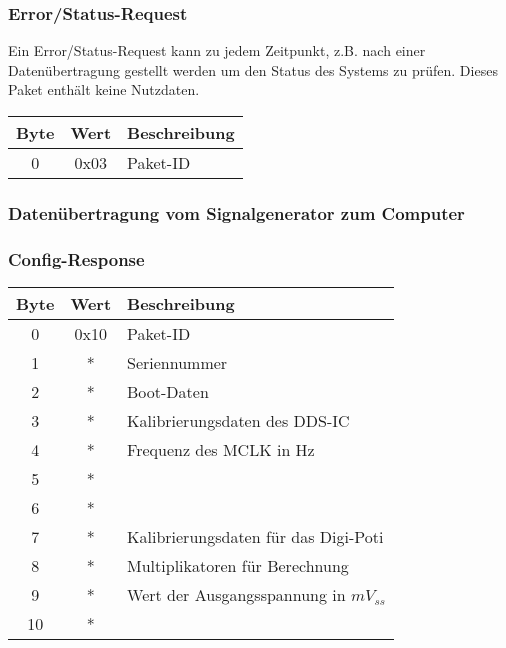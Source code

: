 \pagebreak
\subsubsection*{Error/Status-Request}
Ein Error/Status-Request kann zu jedem Zeitpunkt, z.B. nach einer Datenübertragung gestellt werden um den Status des Systems zu prüfen. Dieses Paket enthält keine Nutzdaten.

\begin{flushleft}
\begin{tabular}{c||c|l}
Byte & Wert & Beschreibung \\
\hline
\hline
0 & 0x03 & Paket-ID \\

\end{tabular}
\end{flushleft}


\subsubsection*{Datenübertragung vom Signalgenerator zum Computer}

\subsubsection*{Config-Response}

\begin{tabular}{c||c|l}
Byte & Wert & Beschreibung \\
\hline
\hline
0 & 0x10 & Paket-ID \\
\hline
1 & * & Seriennummer \\
\hline
2 & * & Boot-Daten \\
\hline
3 & * & Kalibrierungsdaten des DDS-IC \\
4 & * & Frequenz des MCLK in Hz \\
5 & * &  \\
6 & * &  \\
\hline
7 & * & Kalibrierungsdaten für das Digi-Poti \\
8 & * & Multiplikatoren für Berechnung \\
\hline
9 & * & Wert der Ausgangsspannung in $mV_{ss}$ \\
10 & * & \\
\end{tabular}

